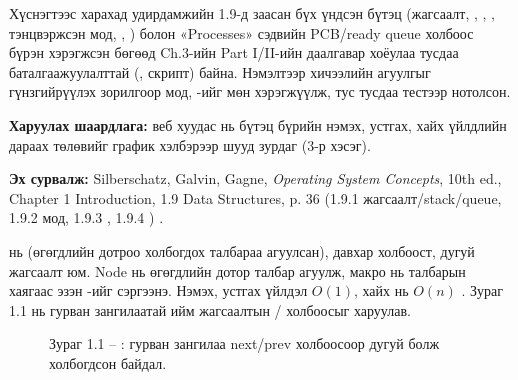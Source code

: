 Хүснэгтээс харахад удирдамжийн 1.9-д заасан бүх үндсэн бүтэц (жагсаалт, , , , тэнцвэржсэн мод, , ) болон «Processes» сэдвийн PCB/ready queue холбоос бүрэн хэрэгжсэн бөгөөд Ch.3-ийн Part I/II-ийн  даалгавар хоёулаа тусдаа баталгаажуулалттай (, скрипт) байна. Нэмэлтээр хичээлийн агуулгыг гүнзгийрүүлэх зорилгоор  мод, -ийг мөн хэрэгжүүлж, тус тусдаа тестээр нотолсон.

\textbf{Харуулах шаардлага:} веб хуудас нь бүтэц бүрийн нэмэх, устгах, хайх үйлдлийн дараах төлөвийг график хэлбэрээр шууд зурдаг (3-р хэсэг).


\textbf{Эх сурвалж:} Silberschatz, Galvin, Gagne, \textit{Operating System Concepts}, 10th ed., Chapter 1 Introduction, 1.9  Data Structures, p. 36 (1.9.1 жагсаалт/stack/queue, 1.9.2 мод, 1.9.3 , 1.9.4 ) .

\textbf{} нь  (өгөгдлийн  дотроо холбогдох талбараа агуулсан), давхар холбоост, дугуй жагсаалт юм. Node нь өгөгдлийн  дотор  талбар агуулж,  макро нь талбарын хаягаас эзэн -ийг сэргээнэ. Нэмэх, устгах үйлдэл $O(1)$, хайх нь $O(n)$ . Зураг 1.1 нь гурван зангилаатай ийм жагсаалтын / холбоосыг харуулав.

\begin{figure}[H]
\centering
{}
\caption*{Зураг 1.1 -- : гурван зангилаа next/prev холбоосоор дугуй болж холбогдсон байдал.}
\end{figure}


